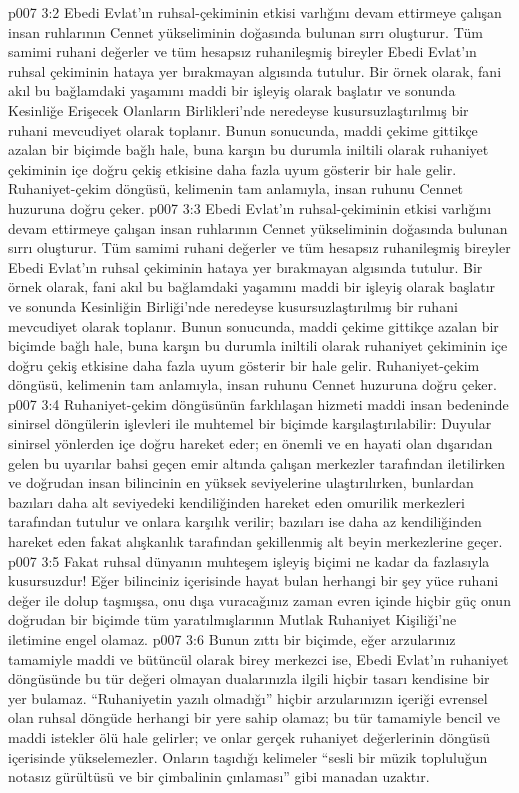 \vs p007 3:2 Ebedi Evlat’ın ruhsal\hyp{}çekiminin etkisi varlığını devam ettirmeye çalışan insan ruhlarının Cennet yükseliminin doğasında bulunan sırrı oluşturur. Tüm samimi ruhani değerler ve tüm hesapsız ruhanileşmiş bireyler Ebedi Evlat’ın ruhsal çekiminin hataya yer bırakmayan algısında tutulur. Bir örnek olarak, fani akıl bu bağlamdaki yaşamını maddi bir işleyiş olarak başlatır ve sonunda Kesinliğe Erişecek Olanların Birlikleri’nde neredeyse kusursuzlaştırılmış bir ruhani mevcudiyet olarak toplanır. Bunun sonucunda, maddi çekime gittikçe azalan bir biçimde bağlı hale, buna karşın bu durumla iniltili olarak ruhaniyet çekiminin içe doğru çekiş etkisine daha fazla uyum gösterir bir hale gelir. Ruhaniyet\hyp{}çekim döngüsü, kelimenin tam anlamıyla, insan ruhunu Cennet huzuruna doğru çeker.
\vs p007 3:3 Ebedi Evlat’ın ruhsal\hyp{}çekiminin etkisi varlığını devam ettirmeye çalışan insan ruhlarının Cennet yükseliminin doğasında bulunan sırrı oluşturur. Tüm samimi ruhani değerler ve tüm hesapsız ruhanileşmiş bireyler Ebedi Evlat’ın ruhsal çekiminin hataya yer bırakmayan algısında tutulur. Bir örnek olarak, fani akıl bu bağlamdaki yaşamını maddi bir işleyiş olarak başlatır ve sonunda Kesinliğin Birliği’nde neredeyse kusursuzlaştırılmış bir ruhani mevcudiyet olarak toplanır. Bunun sonucunda, maddi çekime gittikçe azalan bir biçimde bağlı hale, buna karşın bu durumla iniltili olarak ruhaniyet çekiminin içe doğru çekiş etkisine daha fazla uyum gösterir bir hale gelir. Ruhaniyet\hyp{}çekim döngüsü, kelimenin tam anlamıyla, insan ruhunu Cennet huzuruna doğru çeker.
\vs p007 3:4 Ruhaniyet\hyp{}çekim döngüsünün farklılaşan hizmeti maddi insan bedeninde sinirsel döngülerin işlevleri ile muhtemel bir biçimde karşılaştırılabilir: Duyular sinirsel yönlerden içe doğru hareket eder; en önemli ve en hayati olan dışarıdan gelen bu uyarılar bahsi geçen emir altında çalışan merkezler tarafından iletilirken ve doğrudan insan bilincinin en yüksek seviyelerine ulaştırılırken, bunlardan bazıları daha alt seviyedeki kendiliğinden hareket eden omurilik merkezleri tarafından tutulur ve onlara karşılık verilir; bazıları ise daha az kendiliğinden hareket eden fakat alışkanlık tarafından şekillenmiş alt beyin merkezlerine geçer.
\vs p007 3:5 Fakat ruhsal dünyanın muhteşem işleyiş biçimi ne kadar da fazlasıyla kusursuzdur! Eğer bilinciniz içerisinde hayat bulan herhangi bir şey yüce ruhani değer ile dolup taşmışsa, onu dışa vuracağınız zaman evren içinde hiçbir güç onun doğrudan bir biçimde tüm yaratılmışlarının Mutlak Ruhaniyet Kişiliği’ne iletimine engel olamaz.
\vs p007 3:6 Bunun zıttı bir biçimde, eğer arzularınız tamamiyle maddi ve bütüncül olarak birey merkezci ise, Ebedi Evlat’ın ruhaniyet döngüsünde bu tür değeri olmayan dualarınızla ilgili hiçbir tasarı kendisine bir yer bulamaz. “Ruhaniyetin yazılı olmadığı” hiçbir arzularınızın içeriği evrensel olan ruhsal döngüde herhangi bir yere sahip olamaz; bu tür tamamiyle bencil ve maddi istekler ölü hale gelirler; ve onlar gerçek ruhaniyet değerlerinin döngüsü içerisinde yükselemezler. Onların taşıdığı kelimeler “sesli bir müzik topluluğun notasız gürültüsü ve bir çimbalinin çınlaması” gibi manadan uzaktır.
